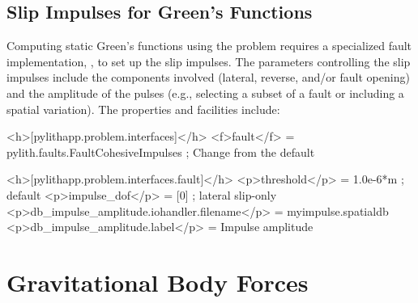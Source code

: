 \subsection{Slip Impulses for Green's Functions}
\label{sec:fault:cohesive:impulses}

Computing static Green's functions using the  problem requires
a specialized fault implementation, , to set
up the slip impulses. The parameters controlling the slip impulses
include the components involved (lateral, reverse, and/or fault opening)
and the amplitude of the pulses (e.g., selecting a subset of a fault
or including a spatial variation). The  properties and facilities
include:
\begin{inventory}
\end{inventory}

\begin{cfg}
<h>[pylithapp.problem.interfaces]</h>
<f>fault</f> = pylith.faults.FaultCohesiveImpulses ; Change from the default 

<h>[pylithapp.problem.interfaces.fault]</h>
<p>threshold</p> = 1.0e-6*m ; default
<p>impulse_dof</p> = [0] ; lateral slip-only
<p>db_impulse_amplitude.iohandler.filename</p> = myimpulse.spatialdb
<p>db_impulse_amplitude.label</p> = Impulse amplitude
\end{cfg}

\section{Gravitational Body Forces}

